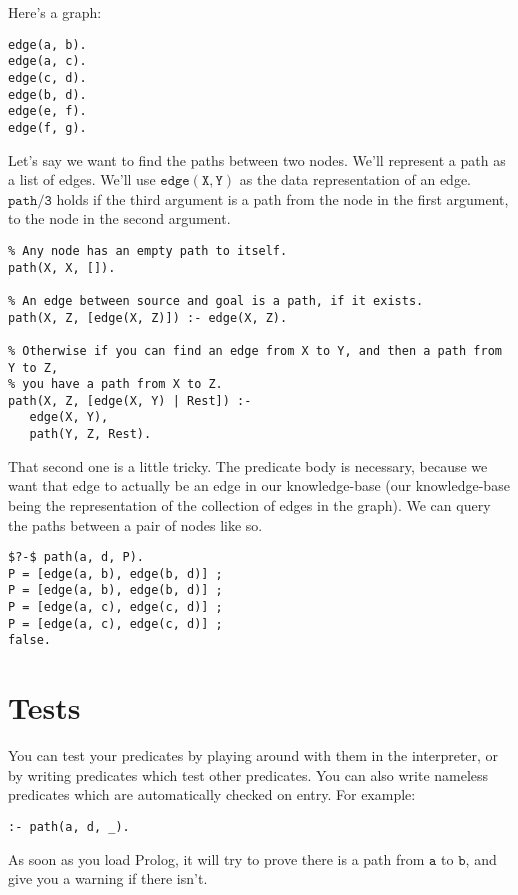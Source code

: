 \documentclass[a4paper,12pt]{article}
\newcommand{\kwa}[1]{\mathtt{#1}}
\begin{document}
\noindent
Here's a graph:

\begin{lstlisting}
edge(a, b).
edge(a, c).
edge(c, d).
edge(b, d).
edge(e, f).
edge(f, g).
\end{lstlisting}

\noindent
Let's say we want to find the paths between two nodes. We'll represent a path as a list of edges. We'll use $\kwa{edge(X, Y)}$ as the data representation of an edge. $\kwa{path \slash 3}$ holds if the third argument is a path from the node in the first argument, to the node in the second argument.

\begin{lstlisting}
% Any node has an empty path to itself.
path(X, X, []).

% An edge between source and goal is a path, if it exists.
path(X, Z, [edge(X, Z)]) :- edge(X, Z).

% Otherwise if you can find an edge from X to Y, and then a path from Y to Z,
% you have a path from X to Z.
path(X, Z, [edge(X, Y) | Rest]) :-
   edge(X, Y),
   path(Y, Z, Rest).
\end{lstlisting}

\noindent
That second one is a little tricky. The predicate body is necessary, because we want that edge to actually be an edge in our knowledge-base (our knowledge-base being the representation of the collection of edges in the graph). We can query the paths between a pair of nodes like so.
\begin{lstlisting}
$?-$ path(a, d, P).
P = [edge(a, b), edge(b, d)] ;
P = [edge(a, b), edge(b, d)] ;
P = [edge(a, c), edge(c, d)] ;
P = [edge(a, c), edge(c, d)] ;
false.
\end{lstlisting}

\section{Tests}

\noindent
You can test your predicates by playing around with them in the interpreter, or by writing predicates which test other predicates. You can also write nameless predicates which are automatically checked on entry. For example:

\begin{lstlisting}
:- path(a, d, _).
\end{lstlisting}

\noindent
As soon as you load Prolog, it will try to prove there is a path from $\kwa{a}$ to $\kwa{b}$, and give you a warning if there isn't.
\end{document}

